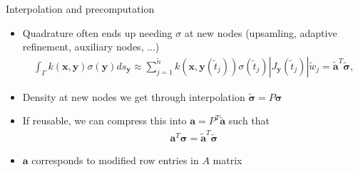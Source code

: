 \documentclass[t]{beamer}
\newcommand{\mbf}[1]{{\bm #1}}           %
\newcommand{\xx}{\mbf{x}}
\newcommand{\yy}{\mbf{y}}
\begin{document}
\begin{frame}{Interpolation and precomputation}
  \begin{itemize}
  \item Quadrature often ends up needing $\sigma$ at new nodes (upsamling, adaptive refinement, auxiliary nodes, ...)
      \begin{align}
        \int_\Gamma k(\xx, \yy) \sigma(\yy) ds_\yy
        \approx
        \sum_{j=1}^{\tilde n} k\left(\xx, \yy(\tilde t_j)\right) \sigma(\tilde t_j) |J_\yy(\tilde t_j)| \tilde w_j = \bm{\tilde a}^T\bm{\tilde\sigma}, 
      \end{align}
    \item Density at new nodes we get through interpolation $\bm{\tilde\sigma} = P\bm{\sigma}$
    \item If reusable, we can compress this into $\bm{a} = P^T\bm{\tilde a}$ such that
      \begin{align}
        \bm{a}^T\bm{\sigma} = \bm{\tilde a}^T\bm{\tilde\sigma}
      \end{align}
    \item $\bm{a}$ corresponds to modified row entries in $A$ matrix
  \end{itemize}
\end{frame}
\end{document}
